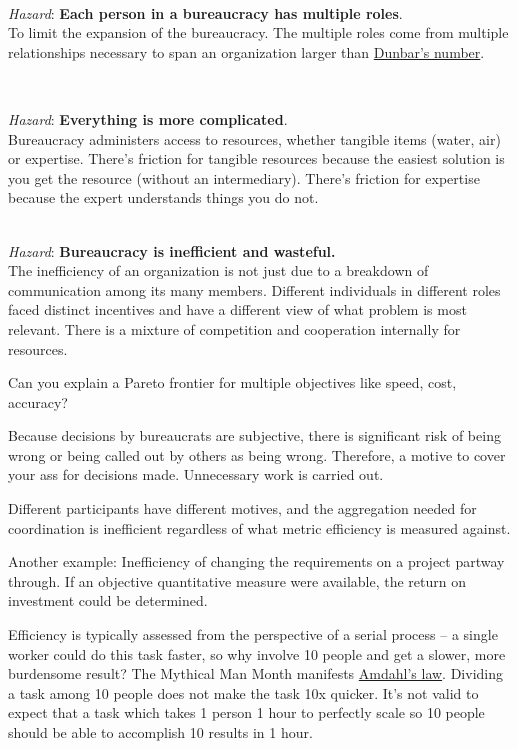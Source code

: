 \ \\
\textit{Hazard}: \textbf{Each person in a bureaucracy has multiple roles}.\\
To limit the expansion of the bureaucracy. The multiple roles come from multiple relationships necessary to span an organization larger than \href{https://en.wikipedia.org/wiki/Dunbar\%27s_number}{Dunbar's number}. 

\ \\
\begin{samepage}
\textit{Hazard}: \textbf{Everything is more complicated}. \\
Bureaucracy administers access to resources, whether tangible items (water, air) or expertise. There's friction for tangible resources because the easiest solution is you get the resource (without an intermediary). There's friction for expertise because the expert understands things you do not. 
\end{samepage}

\ \\
\textit{Hazard}: \textbf{Bureaucracy is inefficient and wasteful.}\\
The inefficiency of an organization is not just due to a breakdown of communication among its many members. Different individuals in different roles faced distinct incentives and have a different view of what problem is most relevant. There is a mixture of competition and cooperation internally for resources.


Can you explain a Pareto frontier for multiple objectives like speed, cost, accuracy?

Because decisions by bureaucrats are subjective, there is significant risk of being wrong or being called out by others as being wrong. Therefore, a motive to cover your ass for decisions made. Unnecessary work is carried out. 

Different participants have different motives, and the aggregation needed for coordination is inefficient regardless of what metric efficiency is measured against.

Another example: Inefficiency of changing the requirements on a project partway through. If an objective quantitative measure were available, the return on investment could be determined. 

Efficiency is typically assessed from the perspective of a serial process -- a single worker could do this task faster, so why involve 10 people and get a slower, more burdensome result? The Mythical Man Month manifests \href{https://en.wikipedia.org/wiki/Amdahl\%27s_law}{Amdahl's law}.
Dividing a task among 10 people does not make the task 10x quicker. It's not valid to expect that a task which takes 1 person 1 hour to perfectly scale so 10 people should be able to accomplish 10 results in 1 hour.

